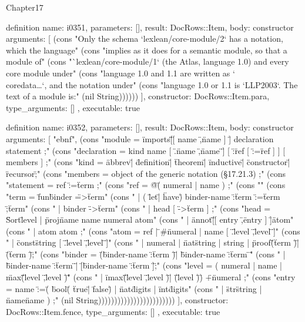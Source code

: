 \begin{lexlean}{Chapter17}
\begin{semanticmodule}
definition{
  name: i0351,
  parameters: [],
  result: DocRows::Item,
  body: constructor{
    arguments: [
      (cons "Only the schema `lexlean/core-module/2` has a notation, which the language" (cons "implies as it does for a semantic module, so that a module of" (cons "`lexlean/core-module/1` (the Atlas, language 1.0) and every core module under" (cons "language 1.0 and 1.1 are written as `\\coredata{…}`, and the notation under" (cons "language 1.0 or 1.1 is `LLP2003`. The text of a module is:" (nil String))))))
    ],
    constructor: DocRows::Item.para,
    type_arguments: []
  },
  executable: true
}

definition{
  name: i0352,
  parameters: [],
  result: DocRows::Item,
  body: constructor{
    arguments: [
      "ebnf",
      (cons "module      = \"imports\" \"[\" [ name { \",\" name } ] \"]\" { declaration } { statement } ;" (cons "declaration = kind name [ \".{\" name { \",\" name } \"}\" ] [ \":\" ref [ \":=\" ref ] ] [ members ] ;" (cons "kind        = \"abbrev\" | \"definition\" | \"theorem\" | \"inductive\" | \"constructor\" | \"recursor\" ;" (cons "members     = object of the generic notation (§17.21.3) ;" (cons "statement   = ref \":=\" term ;" (cons "ref         = \"@\" ( numeral | name ) ;" (cons "" (cons "term     = \"fun\" binder \"=>\" term" (cons "         | ( \"let\" | \"have\" ) binder-name \":\" term \":=\" term \";\" term" (cons "         | binder \"->\" term" (cons "         | head [ \"->\" term ] ;" (cons "head     = \"Sort\" level | \"proj\" name name numeral atom" (cons "         | \"annot\" \"[\" [ entry { \",\" entry } ] \"]\" atom" (cons "         | atom { atom } ;" (cons "atom     = ref | \"#\" numeral | name [ \".{\" level { \",\" level } \"}\" ]" (cons "         | \"const\" string [ \".{\" level { \",\" level } \"}\" ]" (cons "         | numeral | \"nat\" string | string | \"proof\" \"(\" term \")\" | \"(\" term \")\" ;" (cons "binder   = \"(\" binder-name \":\" term \")\" | \"{\" binder-name \":\" term \"}\"" (cons "         | \"{{\" binder-name \":\" term \"}}\" | \"[\" binder-name \":\" term \"]\" ;" (cons "level    = ( numeral | name | \"max\" \"(\" level \",\" level \")\"" (cons "           | \"imax\" \"(\" level \",\" level \")\" | \"(\" level \")\" ) { \"+\" numeral } ;" (cons "entry    = name \":=\" ( \"bool\" ( \"true\" | \"false\" ) | \"nat\" digits | \"int\" digits" (cons "                     | \"str\" string | \"name\" name ) ;" (nil String))))))))))))))))))))))))
    ],
    constructor: DocRows::Item.fence,
    type_arguments: []
  },
  executable: true
}


\end{semanticmodule}
\end{lexlean}
